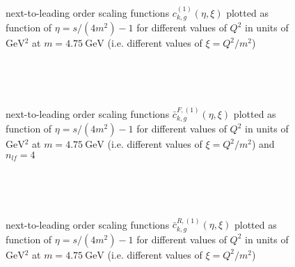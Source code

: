 \pagebreak
\begin{figure}[ht!]
\centering
\begin{subfigure}[t]{\textwidth}
	
\end{subfigure}\\%
\begin{subfigure}[t]{\textwidth}
	
\end{subfigure}\\%
\begin{subfigure}[t]{\textwidth}
	
\end{subfigure}
\caption{next-to-leading order scaling functions $c_{k,g}^{(1)}(\eta,\xi)$ plotted as function of $\eta=s/(4m^2)-1$ for different values of $Q^2$ in units of $\si{\GeV^2}$ at $m=\SI{4.75}{\GeV}$ (i.e. different values of $\xi=Q^2/m^2$) }\label{fig:cg1}
\end{figure}

\pagebreak
\begin{figure}[ht!]
\centering
\begin{subfigure}[t]{\textwidth}
	
\end{subfigure}\\%
\begin{subfigure}[t]{\textwidth}
	
\end{subfigure}\\%
\begin{subfigure}[t]{\textwidth}
	
\end{subfigure}
\caption{next-to-leading order scaling functions $\bar c_{k,g}^{F,(1)}(\eta,\xi)$ plotted as function of $\eta=s/(4m^2)-1$ for different values of $Q^2$ in units of $\si{\GeV^2}$ at $m=\SI{4.75}{\GeV}$ (i.e. different values of $\xi=Q^2/m^2$) and $n_{lf}=4$ }\label{fig:cgBarF1}
\end{figure}

\pagebreak
\begin{figure}[ht!]
\centering
\begin{subfigure}[t]{\textwidth}
	
\end{subfigure}\\%
\begin{subfigure}[t]{\textwidth}
	
\end{subfigure}\\%
\begin{subfigure}[t]{\textwidth}
	
\end{subfigure}
\caption{next-to-leading order scaling functions $\bar c_{k,g}^{R,(1)}(\eta,\xi)$ plotted as function of $\eta=s/(4m^2)-1$ for different values of $Q^2$ in units of $\si{\GeV^2}$ at $m=\SI{4.75}{\GeV}$ (i.e. different values of $\xi=Q^2/m^2$)}\label{fig:cgBarR1}
\end{figure}

